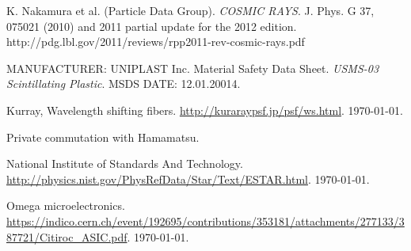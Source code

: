 \documentclass[a4paper]{article}\linespread{1.4}
\begin{document}
\begin{thebibliography}{9}
K. Nakamura et al. (Particle Data Group). 
\textit{COSMIC RAYS}.
J. Phys. G 37, 075021 (2010)  and 2011 partial update for the 2012 edition. 
http://pdg.lbl.gov/2011/reviews/rpp2011-rev-cosmic-rays.pdf


MANUFACTURER: UNIPLAST Inc. 
Material Safety Data Sheet.
\textit{USMS-03 Scintillating Plastic}. 
MSDS DATE: 12.01.20014.

Kurray, Wavelength shifting fibers.
\url{http://kuraraypsf.jp/psf/ws.html}. 
\today.

Private commutation with Hamamatsu.

National Institute of Standards And Technology.
\url{http://physics.nist.gov/PhysRefData/Star/Text/ESTAR.html}. 
\today.

Omega microelectronics.
\url{https://indico.cern.ch/event/192695/contributions/353181/attachments/277133/387721/Citiroc_ASIC.pdf}.
\today.


















\end{thebibliography}
\end{document}
